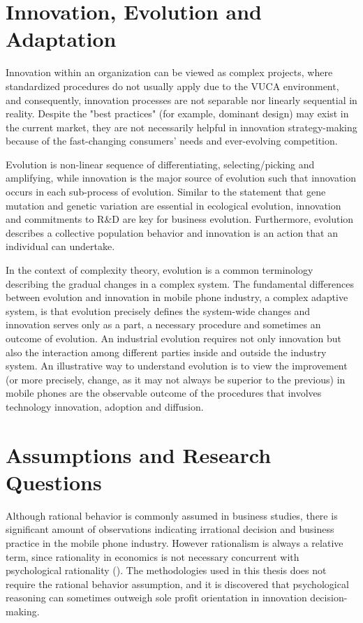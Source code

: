 \documentclass[utf8,english]{gradu3}
\begin{document}
\section{Innovation, Evolution and Adaptation}

Innovation within an organization can be viewed as complex projects, where standardized  procedures do not usually apply due to the VUCA environment, and consequently, innovation processes are not separable nor linearly sequential in reality. Despite the "best practices" (for example, dominant design) may exist in the current market, they are not necessarily helpful in innovation strategy-making because of the fast-changing consumers' needs and ever-evolving competition. 

Evolution is non-linear sequence of differentiating, selecting/picking and amplifying, while innovation is the major source of evolution such that innovation occurs in each sub-process of evolution. Similar to the statement that gene mutation and genetic variation are essential in ecological evolution, innovation and commitments to R\&D are key for business evolution. Furthermore, evolution describes a collective population behavior and innovation is an action that an individual can undertake.

In the context of complexity theory, evolution is a common terminology describing the gradual changes in a complex system. The fundamental differences between evolution and innovation in mobile phone industry, a complex adaptive system, is that evolution precisely defines the system-wide changes and innovation serves only as a part, a necessary procedure and sometimes an outcome of evolution. An industrial evolution requires not only innovation but also the interaction among different parties inside and outside the industry system. An illustrative way to understand evolution is to view the improvement (or more precisely, change, as it may not always be superior to the previous) in mobile phones are the observable outcome of the procedures that involves technology innovation, adoption and diffusion.

\section{Assumptions and Research Questions}

Although rational behavior is commonly assumed in business studies, there is significant amount of observations indicating irrational decision and business practice in the mobile phone industry. However rationalism is always a relative term, since rationality in economics is not necessary concurrent with psychological rationality (\cite{hogarth1987rational}). The methodologies used in this thesis does not require the rational behavior assumption, and it is discovered that psychological reasoning can sometimes outweigh sole profit orientation in innovation decision-making.
\end{document}
